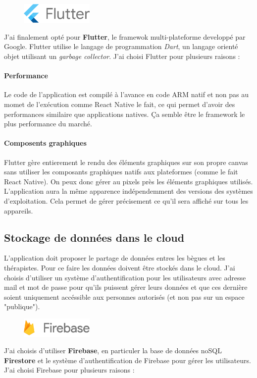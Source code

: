 \begin{figure}
  \includegraphics[width=100pt]{content/imgs/flutter.png}
\end{figure}

J'ai finalement opté pour \textbf{Flutter},  le framewok multi-plateforme developpé par Google. Flutter utilise le langage de programmation \textit{Dart}, un langage orienté objet utilisant un \textit{garbage collector}. J'ai choisi Flutter pour plusieurs raisons :

\paragraph{Performance}
Le code de l'application est compilé à l'avance en code ARM natif et non pas au momet de l'exécution comme React Native le fait, ce qui permet d'avoir des performances similaire que applications natives. Ça semble être le framework le plus performance du marché.

\paragraph{Composents graphiques}
Flutter gère entierement le rendu des éléments graphiques sur son propre canvas sans utiliser les composants graphiques natifs aux plateformes (comme le fait React Native). On peux donc gérer au pixels près les éléments graphiques utilisés. L'application aura la même apparence indépendemment des versions des systèmes d'exploitation. Cela permet de gérer précisement ce qu'il sera affiché sur tous les appareils.


\subsection{Stockage de données dans le cloud}

L'application doit proposer le partage de données entres les bègues et les thérapistes. Pour ce faire les données doivent être stockés dans le cloud. J'ai choisis d'utiliser un système d'authentification pour les utilisateurs avec adresse mail et mot de passe pour qu'ils puissent gérer leurs données et que ces dernière soient uniquement accéssible aux personnes autorisés (et non pas sur un espace "publique").

\begin{figure}
  \includegraphics[width=100pt]{content/imgs/firebase.png}
\end{figure}
J'ai choisis d'utiliser \textbf{Firebase}, en particuler la base de données noSQL \textbf{Firestore} et le système d'authentification de Firebase pour gérer les utilisateurs. J'ai choisi Firebase pour plusieurs raisons :

